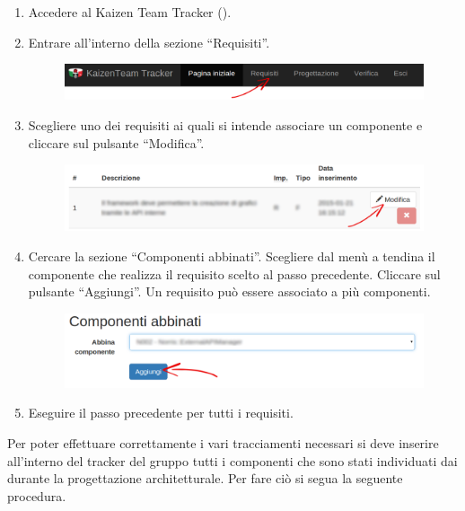 					\begin{enumerate}
						\item Accedere al Kaizen Team Tracker ().
						\item Entrare all'interno della sezione “Requisiti”.
						\begin{figure}[H]
							\centering
							\includegraphics[width=\textwidth]{Pics/HomePageMenuFrecciaReq}
						\end{figure}
						\item Scegliere uno dei requisiti ai quali si intende associare un componente e cliccare sul pulsante “Modifica”.
						\begin{figure}[H]
							\centering
							\includegraphics[width=\textwidth]{Pics/VistaRequisitoFrecciaModifica}
						\end{figure}
						\item Cercare la sezione “Componenti abbinati”. Scegliere dal menù a tendina il componente che realizza il requisito scelto al passo precedente. Cliccare sul pulsante “Aggiungi”. Un requisito  può essere associato a più componenti.
						\begin{figure}[H]
							\centering
							\includegraphics[width=\textwidth]{Pics/AbbianareComponenteRequisito}
						\end{figure}
						\item Eseguire il passo precedente per tutti i requisiti.
					\end{enumerate}
				 \label{sec:InsComponente}
					Per poter effettuare correttamente i vari tracciamenti necessari si deve inserire all'interno del tracker del gruppo tutti i componenti che sono stati individuati dai  durante la progettazione architetturale. Per fare ciò si segua la seguente procedura.
